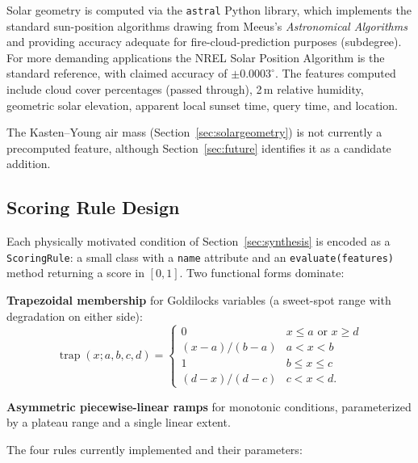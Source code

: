 \documentclass[11pt,a4paper]{article}
\DeclareMathOperator{\trap}{trap}
\begin{document}
Solar geometry is computed via the \texttt{astral} Python library, which implements the standard sun-position algorithms drawing from Meeus's \emph{Astronomical Algorithms} and providing accuracy adequate for fire-cloud-prediction purposes (subdegree). For more demanding applications the NREL Solar Position Algorithm \citep{reda2004spa} is the standard reference, with claimed accuracy of $\pm 0.0003^\circ$. The features computed include cloud cover percentages (passed through), 2\,m relative humidity, geometric solar elevation, apparent local sunset time, query time, and location.

The Kasten--Young air mass (Section~\ref{sec:solargeometry}) is not currently a precomputed feature, although Section~\ref{sec:future} identifies it as a candidate addition.

\subsection{Scoring Rule Design}
\label{sec:rules}

Each physically motivated condition of Section~\ref{sec:synthesis} is encoded as a \texttt{ScoringRule}: a small class with a \texttt{name} attribute and an \texttt{evaluate(features)} method returning a score in $[0, 1]$. Two functional forms dominate:

\textbf{Trapezoidal membership} for Goldilocks variables (a sweet-spot range with degradation on either side):
\begin{equation}
\trap(x; a, b, c, d) = \begin{cases}
0 & x \leq a \text{ or } x \geq d \\
(x-a)/(b-a) & a < x < b \\
1 & b \leq x \leq c \\
(d-x)/(d-c) & c < x < d.
\end{cases}
\label{eq:trapezoid}
\end{equation}

\textbf{Asymmetric piecewise-linear ramps} for monotonic conditions, parameterized by a plateau range and a single linear extent.

The four rules currently implemented and their parameters:
\end{document}
